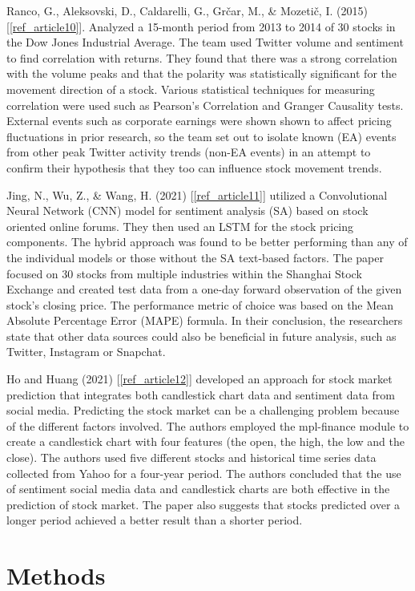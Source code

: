 \documentclass{llncs}
\begin{document}
Ranco, G., Aleksovski, D., Caldarelli, G., Grčar, M., \& Mozetič, I. (2015) [\ref{ref_article10}].  Analyzed a 15-month period from 2013 to 2014 of 30 stocks in the Dow Jones Industrial Average.  The team used Twitter volume and sentiment to find correlation with returns.  They found that there was a strong correlation with the volume peaks and that the polarity was statistically significant for the movement direction of a stock.  Various statistical techniques for measuring correlation were used such as Pearson's Correlation and Granger Causality tests.  External events such as corporate earnings were shown shown to affect pricing fluctuations in prior research, so the team set out to isolate known (EA) events from other peak Twitter activity trends (non-EA events) in an attempt to confirm their hypothesis that they too can influence stock movement trends.

Jing, N., Wu, Z., \& Wang, H. (2021) [\ref{ref_article11}]  utilized a Convolutional Neural Network (CNN) model for sentiment analysis (SA) based on stock oriented online forums.  They then used an LSTM for the stock pricing components.  The hybrid approach was found to be better performing than any of the individual models or those without the SA text-based factors.  The paper focused on 30 stocks from multiple industries within the Shanghai Stock Exchange and created test data from a one-day forward observation of the given stock's closing price.  The performance  metric of choice was based on the Mean Absolute Percentage Error (MAPE) formula.  In their conclusion, the researchers state that other data sources could also be beneficial in future analysis, such as Twitter, Instagram or Snapchat. 

Ho and Huang (2021) [\ref{ref_article12}] developed an approach for stock market prediction that integrates both candlestick chart data and sentiment data from social media. Predicting the stock market can be a challenging problem because of the different factors involved. The authors employed the mpl-finance module to create a candlestick chart with four features (the open, the high, the low and the close). The authors used five different stocks and historical time series data collected from Yahoo for a four-year period. The authors concluded that the use of sentiment social media data and candlestick charts are both effective in the prediction of stock market. The paper also suggests that stocks predicted over a longer period achieved a better result than a shorter period.

\section{Methods}
\end{document}
